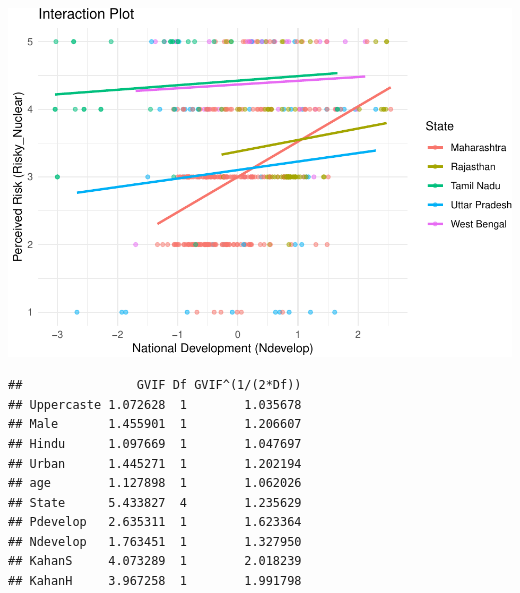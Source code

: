 \documentclass[
]{article}
\begin{document}
\includegraphics{Paper1_files/figure-latex/unnamed-chunk-30-1.pdf}

\begin{verbatim}
##                GVIF Df GVIF^(1/(2*Df))
## Uppercaste 1.072628  1        1.035678
## Male       1.455901  1        1.206607
## Hindu      1.097669  1        1.047697
## Urban      1.445271  1        1.202194
## age        1.127898  1        1.062026
## State      5.433827  4        1.235629
## Pdevelop   2.635311  1        1.623364
## Ndevelop   1.763451  1        1.327950
## KahanS     4.073289  1        2.018239
## KahanH     3.967258  1        1.991798
\end{verbatim}
\end{document}
